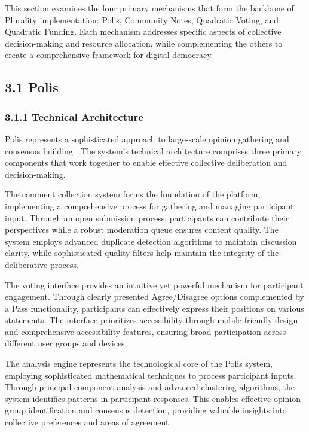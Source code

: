 This section examines the four primary mechanisms that form the backbone of Plurality implementation: Polis, Community Notes, Quadratic Voting, and Quadratic Funding. Each mechanism addresses specific aspects of collective decision-making and resource allocation, while complementing the others to create a comprehensive framework for digital democracy.

\hypertarget{polis}{%
\subsection{3.1 Polis}\label{polis}}

\hypertarget{technical-architecture}{%
\subsubsection{3.1.1 Technical Architecture}\label{technical-architecture}}

Polis represents a sophisticated approach to large-scale opinion gathering and consensus building \citep{polis2024}. The system's technical architecture comprises three primary components that work together to enable effective collective deliberation and decision-making.

The comment collection system forms the foundation of the platform, implementing a comprehensive process for gathering and managing participant input. Through an open submission process, participants can contribute their perspectives while a robust moderation queue ensures content quality. The system employs advanced duplicate detection algorithms to maintain discussion clarity, while sophisticated quality filters help maintain the integrity of the deliberative process.

The voting interface provides an intuitive yet powerful mechanism for participant engagement. Through clearly presented Agree/Disagree options complemented by a Pass functionality, participants can effectively express their positions on various statements. The interface prioritizes accessibility through mobile-friendly design and comprehensive accessibility features, ensuring broad participation across different user groups and devices.

The analysis engine represents the technological core of the Polis system, employing sophisticated mathematical techniques to process participant inputs. Through principal component analysis and advanced clustering algorithms, the system identifies patterns in participant responses. This enables effective opinion group identification and consensus detection, providing valuable insights into collective preferences and areas of agreement.

